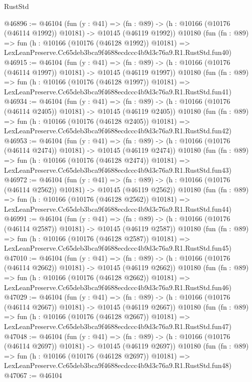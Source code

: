 \begin{lexlean}{RustStd}
\begin{coremodule}
@46896 := @46104
    (fun (y : @41) =>
    (fn : @89) -> (h : @10166 (@10176 (@46114 @1992)) @10181) -> @10145 (@46119 @1992))
    @10180
    (fun (fn : @89) =>
    fun (h : @10166 (@10176 (@46128 @1992)) @10181) =>
    LexLeanPreserve.Cc65deb3bca9f4688ecdccc4b9d3c76a9.R1.RustStd.fun40)
@46915 := @46104
    (fun (y : @41) =>
    (fn : @89) -> (h : @10166 (@10176 (@46114 @1997)) @10181) -> @10145 (@46119 @1997))
    @10180
    (fun (fn : @89) =>
    fun (h : @10166 (@10176 (@46128 @1997)) @10181) =>
    LexLeanPreserve.Cc65deb3bca9f4688ecdccc4b9d3c76a9.R1.RustStd.fun41)
@46934 := @46104
    (fun (y : @41) =>
    (fn : @89) -> (h : @10166 (@10176 (@46114 @2405)) @10181) -> @10145 (@46119 @2405))
    @10180
    (fun (fn : @89) =>
    fun (h : @10166 (@10176 (@46128 @2405)) @10181) =>
    LexLeanPreserve.Cc65deb3bca9f4688ecdccc4b9d3c76a9.R1.RustStd.fun42)
@46953 := @46104
    (fun (y : @41) =>
    (fn : @89) -> (h : @10166 (@10176 (@46114 @2474)) @10181) -> @10145 (@46119 @2474))
    @10180
    (fun (fn : @89) =>
    fun (h : @10166 (@10176 (@46128 @2474)) @10181) =>
    LexLeanPreserve.Cc65deb3bca9f4688ecdccc4b9d3c76a9.R1.RustStd.fun43)
@46972 := @46104
    (fun (y : @41) =>
    (fn : @89) -> (h : @10166 (@10176 (@46114 @2562)) @10181) -> @10145 (@46119 @2562))
    @10180
    (fun (fn : @89) =>
    fun (h : @10166 (@10176 (@46128 @2562)) @10181) =>
    LexLeanPreserve.Cc65deb3bca9f4688ecdccc4b9d3c76a9.R1.RustStd.fun44)
@46991 := @46104
    (fun (y : @41) =>
    (fn : @89) -> (h : @10166 (@10176 (@46114 @2587)) @10181) -> @10145 (@46119 @2587))
    @10180
    (fun (fn : @89) =>
    fun (h : @10166 (@10176 (@46128 @2587)) @10181) =>
    LexLeanPreserve.Cc65deb3bca9f4688ecdccc4b9d3c76a9.R1.RustStd.fun45)
@47010 := @46104
    (fun (y : @41) =>
    (fn : @89) -> (h : @10166 (@10176 (@46114 @2662)) @10181) -> @10145 (@46119 @2662))
    @10180
    (fun (fn : @89) =>
    fun (h : @10166 (@10176 (@46128 @2662)) @10181) =>
    LexLeanPreserve.Cc65deb3bca9f4688ecdccc4b9d3c76a9.R1.RustStd.fun46)
@47029 := @46104
    (fun (y : @41) =>
    (fn : @89) -> (h : @10166 (@10176 (@46114 @2667)) @10181) -> @10145 (@46119 @2667))
    @10180
    (fun (fn : @89) =>
    fun (h : @10166 (@10176 (@46128 @2667)) @10181) =>
    LexLeanPreserve.Cc65deb3bca9f4688ecdccc4b9d3c76a9.R1.RustStd.fun47)
@47048 := @46104
    (fun (y : @41) =>
    (fn : @89) -> (h : @10166 (@10176 (@46114 @2697)) @10181) -> @10145 (@46119 @2697))
    @10180
    (fun (fn : @89) =>
    fun (h : @10166 (@10176 (@46128 @2697)) @10181) =>
    LexLeanPreserve.Cc65deb3bca9f4688ecdccc4b9d3c76a9.R1.RustStd.fun48)
@47067 := @46104

\end{coremodule}
\end{lexlean}
